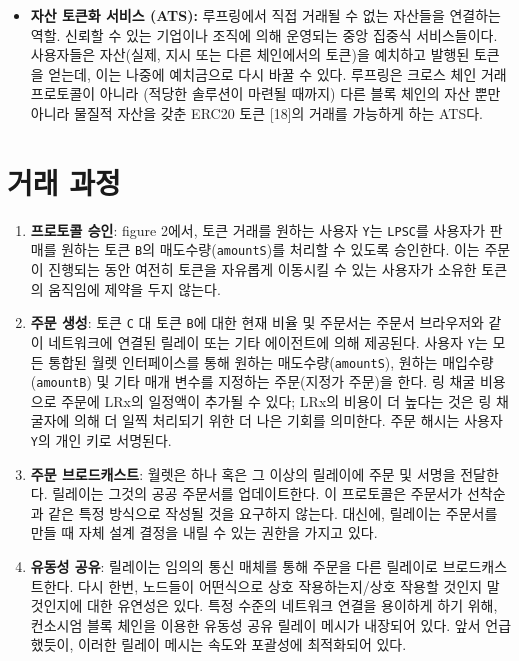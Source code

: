 \documentclass{article}
\begin{document}
\begin{multicols}{2}
\begin{itemize}
	\item \textbf{자산 토큰화 서비스 (ATS):} 루프링에서 직접 거래될 수 없는 자산들을 연결하는 역할. 신뢰할 수 있는 기업이나 조직에 의해 운영되는 중앙 집중식 서비스들이다. 사용자들은 자산(실제, 지시 또는 다른 체인에서의 토큰)을 예치하고 발행된 토큰을 얻는데, 이는 나중에 예치금으로 다시 바꿀 수 있다. 루프링은 크로스 체인 거래 프로토콜이 아니라 (적당한 솔루션이 마련될 때까지) 다른 블록 체인의 자산 뿐만아니라 물질적 자산을 갖춘 ERC20 토큰 [18]의 거래를 가능하게 하는 ATS다.

\end{itemize}



\section{거래 과정\label{sec:process}}

\begin{enumerate} 
	
	\item \textbf{프로토콜 승인}: figure 2에서, 토큰 거래를 원하는 사용자 \verb|Y|는 \verb|LPSC|를 사용자가 판매를 원하는 토큰 \verb|B|의 매도수량(\verb|amountS|)를 처리할 수 있도록 승인한다. 이는 주문이 진행되는 동안 여전히 토큰을 자유롭게 이동시킬 수 있는 사용자가 소유한 토큰의 움직임에 제약을 두지 않는다.
	
	\item \textbf{주문 생성}: 토큰 \verb|C| 대 토큰 \verb|B|에 대한 현재 비율 및 주문서는 주문서 브라우저와 같이 네트워크에 연결된 릴레이 또는 기타 에이전트에 의해 제공된다. 사용자 \verb|Y|는 모든 통합된 월렛 인터페이스를 통해 원하는 매도수량(\verb|amountS|), 원하는 매입수량(\verb|amountB|) 및 기타 매개 변수를 지정하는 주문(지정가 주문)을 한다. 링 채굴 비용으로 주문에 LRx의 일정액이 추가될 수 있다; LRx의 비용이 더 높다는 것은 링 채굴자에 의해 더 일찍 처리되기 위한 더 나은 기회를 의미한다. 주문 해시는 사용자 \verb|Y|의 개인 키로 서명된다.
	
    \item \textbf{주문 브로드캐스트}: 월렛은 하나 혹은 그 이상의 릴레이에 주문 및 서명을 전달한다. 릴레이는 그것의 공공 주문서를 업데이트한다. 이 프로토콜은 주문서가 선착순과 같은 특정 방식으로 작성될 것을 요구하지 않는다. 대신에, 릴레이는 주문서를 만들 때 자체 설계 결정을 내릴 수 있는 권한을 가지고 있다. 
    
    \item \textbf{유동성 공유}: 릴레이는 임의의 통신 매체를 통해 주문을 다른 릴레이로 브로드캐스트한다. 다시 한번, 노드들이 어떤식으로 상호 작용하는지/상호 작용할 것인지 말 것인지에 대한 유연성은 있다. 특정 수준의 네트워크 연결을 용이하게 하기 위해, 컨소시엄 블록 체인을 이용한 유동성 공유 릴레이 메시가 내장되어 있다. 앞서 언급했듯이, 이러한 릴레이 메시는 속도와 포괄성에 최적화되어 있다.


\end{enumerate}
\end{multicols}
\end{document}
